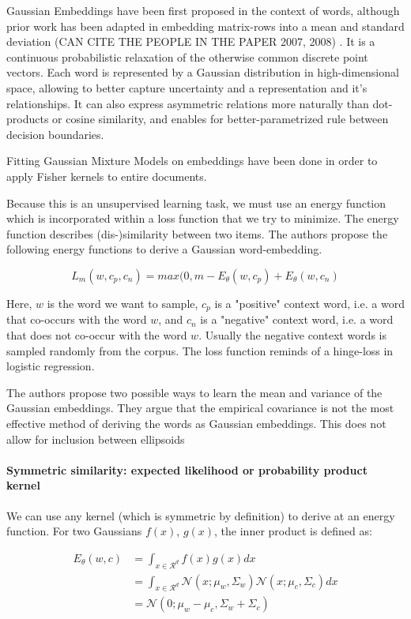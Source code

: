 \documentclass[a4paper,12pt,twoside,openright]{report}
\begin{document}
Gaussian Embeddings have been first proposed in the context of words, although prior work has been adapted in embedding matrix-rows into a mean and standard deviation (CAN CITE THE PEOPLE IN THE PAPER 2007, 2008) .
It is a continuous probabilistic relaxation of the otherwise common discrete point vectors.
Each word is represented by a Gaussian distribution in high-dimensional space, allowing to better capture uncertainty and a representation and it's relationships.
It can also express asymmetric relations more naturally than dot-products or cosine similarity, and enables for better-parametrized rule between decision boundaries.

Fitting Gaussian Mixture Models on embeddings have been done in order to apply Fisher kernels to entire documents.

Because this is an unsupervised learning task, we must use an energy function which is incorporated within a loss function that we try to minimize. 
The energy function describes (dis-)similarity between two items.
The authors propose the following energy functions to derive a Gaussian word-embedding.

\begin{equation}
L_m(w, c_p, c_n) = max(0, m - E_\theta(w, c_p) + E_\theta(w, c_n)
\end{equation}

Here, $w$ is the word we want to sample, $c_p$ is a "positive" context word, i.e. a word that co-occurs with the word $w$, and $c_n$ is a "negative" context word, i.e. a word that does not co-occur with the word $w$.
Usually the negative context words is sampled randomly from the corpus.
The loss function reminds of a hinge-loss in logistic regression.

The authors propose two possible ways to learn the mean and variance of the Gaussian embeddings.
They argue that the empirical covariance is not the most effective method of deriving the words as Gaussian embeddings.
This does not allow for inclusion between ellipsoids 

\paragraph{Symmetric similarity: expected likelihood or probability product kernel}

We can use any kernel (which is symmetric by definition) to derive at an energy function.
For two Gaussians $f(x)$, $g(x)$, the inner product is defined as:

\begin{align}
E_\theta(w, c) &= \int_{x \in \mathcal{R}^d} f(x)g(x) dx \\
&= \int_{x \in \mathcal{R}^d} \mathcal{N}(x; \mu_w, \Sigma_w) \mathcal{N}(x; \mu_c, \Sigma_c) dx \\
&= \mathcal{N}(0; \mu_w - \mu_c, \Sigma_w + \Sigma_c)
\end{align}
\end{document}
